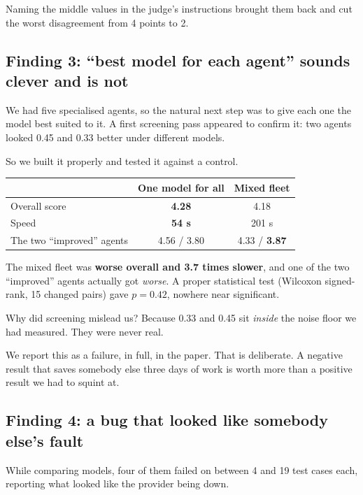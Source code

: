 \documentclass[11pt]{article}
\begin{document}
Naming the middle values in the judge's instructions brought them back and cut
the worst disagreement from 4 points to 2.

\subsection{Finding 3: ``best model for each agent'' sounds clever and is not}

We had five specialised agents, so the natural next step was to give each one
the model best suited to it. A first screening pass appeared to confirm it: two
agents looked 0.45 and 0.33 better under different models.

So we built it properly and tested it against a control.

\begin{center}
\small
\begin{tabular}{@{}lcc@{}}
\toprule
 & One model for all & Mixed fleet\\
\midrule
Overall score & \textbf{4.28} & 4.18\\
Speed & \textbf{54 s} & 201 s\\
The two ``improved'' agents & 4.56 / 3.80 & 4.33 / \textbf{3.87}\\
\bottomrule
\end{tabular}
\end{center}

The mixed fleet was \textbf{worse overall and 3.7 times slower}, and one of the
two ``improved'' agents actually got \emph{worse}. A proper statistical test
(Wilcoxon signed-rank, 15 changed pairs) gave $p = 0.42$, nowhere near
significant.

Why did screening mislead us? Because 0.33 and 0.45 sit \emph{inside} the noise
floor we had measured. They were never real.

\begin{callout}
We report this as a failure, in full, in the paper. That is deliberate. A
negative result that saves somebody else three days of work is worth more than a
positive result we had to squint at.
\end{callout}

\subsection{Finding 4: a bug that looked like somebody else's fault}

While comparing models, four of them failed on between 4 and 19 test cases each,
reporting what looked like the provider being down.
\end{document}
